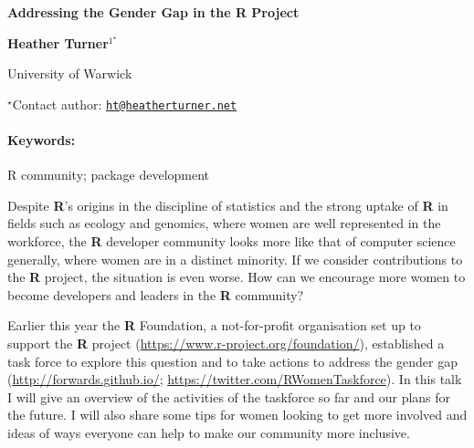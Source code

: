 \documentclass[11pt, a4paper]{article}
\renewcommand{\title}[1]{\begin{center}{\bf \LARGE #1}\end{center}}
\newcommand{\keywords}{\paragraph{Keywords:}}
\begin{document}
\pagestyle{empty}

\title{Addressing the Gender Gap in the R Project}

\begin{center}
  {\bf Heather Turner$^{1^\star}$}
\end{center}

\vskip 0.3cm

\begin{affiliations}
\begin{enumerate}
\begin{minipage}{0.915\textwidth}
\centering
\item University of Warwick \\[-2pt]
\end{minipage}
\end{enumerate}
$^\star$Contact author: \href{mailto:ht@heatherturner.net}{\nolinkurl{ht@heatherturner.net}}\\
\end{affiliations}

\vskip 0.5cm

\begin{minipage}{0.915\textwidth}
\keywords R community; package development
\end{minipage}

\vskip 0.8cm

Despite \textbf{R}'s origins in the discipline of statistics and the
strong uptake of \textbf{R} in fields such as ecology and genomics,
where women are well represented in the workforce, the \textbf{R}
developer community looks more like that of computer science generally,
where women are in a distinct minority. If we consider contributions to
the \textbf{R} project, the situation is even worse. How can we
encourage more women to become developers and leaders in the \textbf{R}
community?

Earlier this year the \textbf{R} Foundation, a not-for-profit
organisation set up to support the \textbf{R} project
(\url{https://www.r-project.org/foundation/}), established a task force
to explore this question and to take actions to address the gender gap
(\url{http://forwards.github.io/};
\url{https://twitter.com/RWomenTaskforce}). In this talk I will give an
overview of the activities of the taskforce so far and our plans for the
future. I will also share some tips for women looking to get more
involved and ideas of ways everyone can help to make our community more
inclusive.
\end{document}

